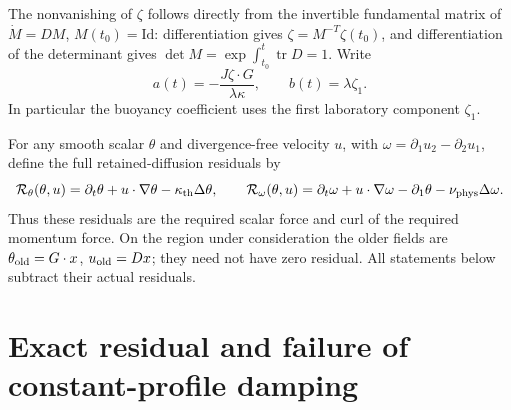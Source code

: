 \documentclass[11pt]{article}
\newcommand{\thd}{\kappa_{\rm th}}
\newcommand{\vis}{\nu_{\rm phys}}
\begin{document}
The nonvanishing of $\zeta$ follows directly from the invertible fundamental
matrix of $\dot M=DM$, $M(t_0)=\mathrm{Id}$: differentiation gives
$\zeta=M^{-T}\zeta(t_0)$, and differentiation of the determinant gives
$\det M=\exp\int_{t_0}^t\operatorname{tr}D=1$.
Write
\begin{equation}\label{eq:ab}
 a(t)=-\frac{J\zeta\cdot G}{\lambda\kappa},\qquad
 b(t)=\lambda\zeta_1.
\end{equation}
In particular the buoyancy coefficient uses the first laboratory component
$\zeta_1$.

For any smooth scalar $\theta$ and divergence-free velocity $u$, with
$\omega=\partial_1u_2-\partial_2u_1$, define the full retained-diffusion
residuals by
\begin{equation}\label{eq:resdef}
 \mathcal R_\theta(\theta,u)
  =\partial_t\theta+u\cdot\nabla\theta-\thd\Delta\theta,
 \qquad
 \mathcal R_\omega(\theta,u)
  =\partial_t\omega+u\cdot\nabla\omega-\partial_1\theta-\vis\Delta\omega.
\end{equation}
Thus these residuals are the required scalar force and curl of the required
momentum force. On the region under consideration the older fields are
$\theta_{\rm old}=G\cdot x$, $u_{\rm old}=Dx$; they need not have zero
residual. All statements below subtract their actual residuals.

\section{Exact residual and failure of constant-profile damping}
\end{document}
